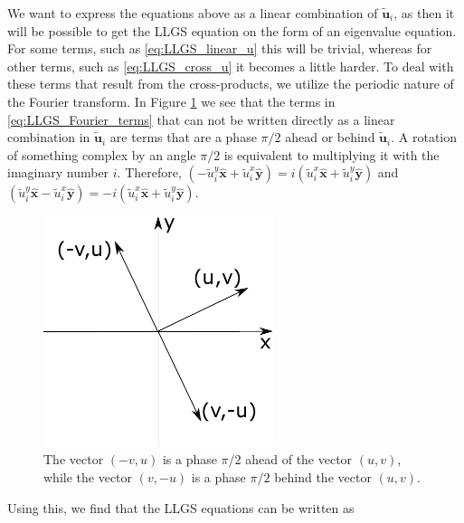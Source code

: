 We want to express the equations above as a linear combination of $\tilde{\mathbold{u}}_i$, as then it will be possible to get the LLGS equation on the form of an eigenvalue equation. For some terms, such as \eqref{eq:LLGS_linear_u} this will be trivial, whereas for other terms, such as \eqref{eq:LLGS_cross_u} it becomes a little harder. To deal with these terms that result from the cross-products, we utilize the periodic nature of the Fourier transform. In Figure \ref{fig:VectorPhases} we see that the terms in \eqref{eq:LLGS_Fourier_terms} that can not be written directly as a linear combination in $\tilde{\mathbold{u}}_i$ are terms that are a phase $\pi/2$ ahead or behind $\tilde{\mathbold{u}}_i$. A rotation of something complex by an angle $\pi/2$ is equivalent to multiplying it with the imaginary number $i$. Therefore, $\left(- \tilde{u}^y_i\mathbold{\hat{x}} + \tilde{u}^x_i \mathbold{\hat{y}} \right) = i \left(\tilde{u}^x_i\mathbold{\hat{x}} + \tilde{u}^y_i \mathbold{\hat{y}} \right)$ and $\left( \tilde{u}^y_i\mathbold{\hat{x}} - \tilde{u}^x_i \mathbold{\hat{y}} \right) = -i \left(\tilde{u}^x_i\mathbold{\hat{x}} + \tilde{u}^y_i \mathbold{\hat{y}} \right)$.
\begin{figure}[h!]
\begin{center}
\includegraphics[width=0.6\textwidth]{Figures/VectorPhases.pdf} 
\caption{The vector $(-v,u)$ is a phase $\pi/2$ ahead of the vector $(u,v)$, while the vector $(v,-u)$ is a phase $\pi/2$ behind the vector $(u,v)$.}
\label{fig:VectorPhases} 
\end{center}
\end{figure}
Using this, we find that the LLGS equations can be written as
